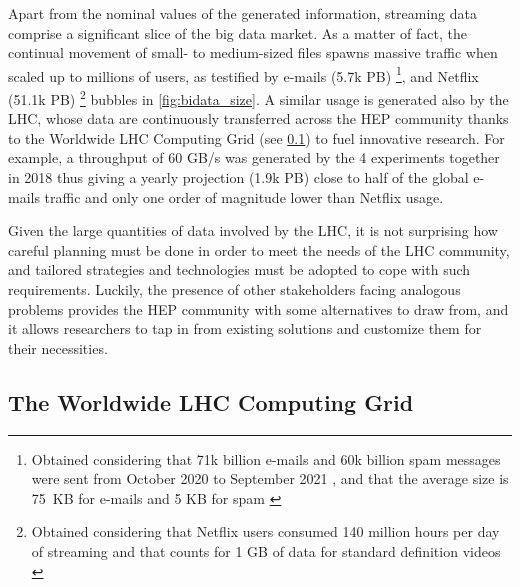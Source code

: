 Apart from the nominal values of the generated information, streaming data comprise a significant slice of the big data market.
As a matter of fact, the continual movement of small- to medium-sized files spawns massive traffic when scaled up to millions of users, as testified by e-mails (5.7k PB)%
\footnote{Obtained considering that 71k billion e-mails and 60k billion spam messages were sent from October 2020 to September 2021 \cite{statista2021mails}, and that the average size is \mbox{75 KB} for e-mails \cite{lifewire2021avg_mail} and \mbox{5} KB for spam \cite{medium2014avg_spam}
},
and Netflix (51.1k PB)%
\footnote{Obtained considering that Netflix users consumed 140 million hours per day of streaming \cite{domo2021infographic} and that counts for 1 GB of data for standard definition videos \cite{perry2021netflix}
} bubbles in \cref{fig:bidata_size}.
A similar usage is generated also by the LHC, whose data are continuously transferred across the HEP community thanks to the Worldwide LHC Computing Grid (see \cref{wlcg}) to fuel innovative research. For example, 
a throughput of 60 GB/s was generated by the 4 experiments together in 2018 \cite{wlcg2018throughput} thus giving a yearly projection (1.9k PB) close to half of the global e-mails traffic and only one order of magnitude lower than Netflix usage.

Given the large quantities of data involved by the LHC, it is not surprising how careful planning must be done in order to meet the needs of the LHC community, and tailored strategies and technologies must be adopted to cope with such requirements. 
Luckily, the presence of other stakeholders facing analogous problems provides the HEP community with some alternatives to draw from, and it allows researchers to tap in from existing solutions and customize them for their necessities.

\subsection{The Worldwide LHC Computing Grid}
\label{wlcg}

